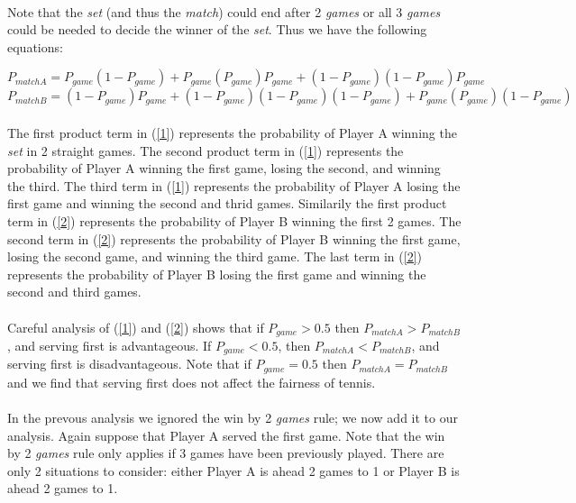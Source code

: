 \documentclass[12pt]{article}
\begin{document}
\paragraph{} Note that the \emph{set} (and thus the \emph{match}) could end after 2 \emph{games} or all 3 \emph{games} could be needed to decide the winner of the \emph{set}. Thus we have the following equations:

\begin{equation}
P_{matchA}=P_{game}(1-P_{game})+P_{game}(P_{game})P_{game}+(1-P_{game})(1-P_{game})P_{game}
\label{1}
\end{equation}
\begin{equation}
P_{matchB}=(1-P_{game})P_{game}+(1-P_{game})(1-P_{game})(1-P_{game})+P_{game}(P_{game})(1-P_{game})
\label{2}
\end{equation}

\paragraph{}The first product term in (\ref{1}) represents the probability of Player A winning the \emph{set} in 2 straight games. The second product term in (\ref{1}) represents the probability of Player A winning the first game, losing the second, and winning the third. The third term in (\ref{1}) represents the probability of Player A losing the first game and winning the second and thrid games. Similarily the first product term in (\ref{2}) represents the probability of Player B winning the first 2 games. The second term in (\ref{2}) represents the probability of Player B winning the first game, losing the second game, and winning the third game. The last term in (\ref{2}) represents the probability of Player B losing the first game and winning the second and third games.


\paragraph{} Careful analysis of (\ref{1}) and (\ref{2}) shows that if $P_{game}>0.5$ then $P_{matchA}>P_{matchB}$, and serving first is advantageous. If $P_{game}<0.5$, then $P_{matchA}<P_{matchB}$, and  serving first is disadvantageous. Note that if $P_{game}=0.5$ then $P_{matchA}=P_{matchB}$ and we find that serving first does not affect the fairness of tennis. 

\paragraph{} In the prevous analysis we ignored the win by 2 \emph{games} rule; we now add it to our analysis. Again suppose that Player A served the first game. Note that the win by 2 \emph{games} rule only applies if 3 games have been previously played. There are only 2 situations to consider: either Player A is ahead 2 games to 1 or Player B is ahead 2 games to 1.
\end{document}
